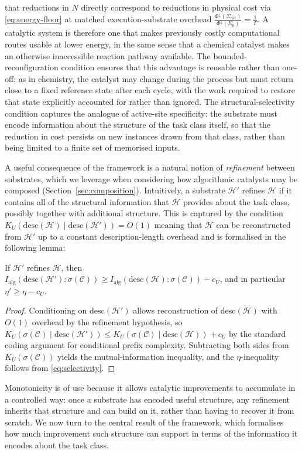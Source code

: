 \documentclass[runningheads]{llncs}
\newcommand{\WPI}{\Phi}
\newcommand{\Sys}{\Sigma}
\newcommand{\Nop}{N}
\newcommand{\Hw}{\mathcal{H}}
\newcommand{\Class}{\mathcal{C}}
\newcommand{\descop}{\mathrm{desc}}
\newcommand{\MutInfo}{I_{\mathrm{alg}}}
\begin{document}
that reductions in $\Nop$ directly correspond to reductions in
physical cost via \eqref{eq:energy-floor} at matched
execution-substrate overhead $\frac{\WPI^{\downarrow}(\Sys_{\mathrm{cat}})}
     {\WPI^{\downarrow}(\Sys_0)} = \frac{1}{\Gamma}$.
A catalytic system is therefore one that makes previously costly
computational routes usable at lower energy, in the same sense that
a chemical catalyst makes an otherwise inaccessible reaction pathway
available. The bounded-reconfiguration
condition ensures that this advantage is reusable rather than
one-off: as in chemistry, the catalyst may change during the process
but must return close to a fixed reference state after each cycle,
with the work required to restore that state explicitly accounted
for rather than ignored. The structural-selectivity condition
captures the analogue of active-site specificity: the substrate must
encode information about the structure of the task class itself, so
that the reduction in cost persists on new instances drawn from that
class, rather than being limited to a finite set of memorised inputs.

A useful consequence of the framework is a natural notion of
\emph{refinement} between substrates, which we leverage when considering how algorithmic catalysts may be composed (Section~\ref{sec:composition}). Intuitively,
a substrate $\Hw'$ refines $\Hw$ if it contains all of the
structural information that $\Hw$ provides about the task class,
possibly together with additional structure. This is
captured by the condition $K_U(\descop(\Hw)\mid\descop(\Hw')) = O(1)$ meaning that $\Hw$ can be reconstructed from $\Hw'$ up to a
constant description-length overhead and is formalised in the following lemma:

\begin{lemma}
\label{lem:monotone}
If $\Hw'$ refines $\Hw$, then
$\MutInfo(\descop(\Hw'):\sigma(\Class))\ge
\MutInfo(\descop(\Hw):\sigma(\Class))-c_U$, and in particular
$\eta'\ge\eta-c_U$.
\end{lemma}
\begin{proof}
Conditioning on $\descop(\Hw')$ allows reconstruction of
$\descop(\Hw)$ with $O(1)$ overhead by the refinement hypothesis,
so $K_U(\sigma(\Class)\mid\descop(\Hw'))\le
K_U(\sigma(\Class)\mid\descop(\Hw))+c_U$ by the standard coding
argument for conditional prefix complexity. Subtracting both sides
from $K_U(\sigma(\Class))$ yields the mutual-information inequality,
and the $\eta$-inequality follows from \eqref{eq:selectivity}.
\end{proof}
Monotonicity is of use because it allows catalytic improvements to accumulate in a controlled way:
once a substrate has encoded useful structure, any refinement
inherits that structure and can build on it, rather than having to
recover it from scratch. We now turn to the central result of the framework,
which formalises how much improvement such structure can support in
terms of the information it encodes about the task class.
\end{document}
